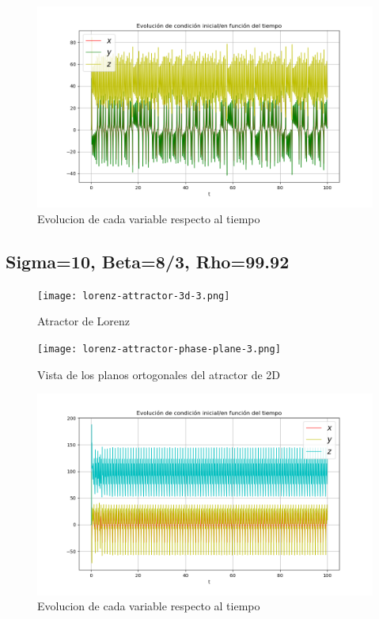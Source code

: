 \documentclass[12pt]{article}
\begin{document}
\begin{figure}
\begin{centering}
  \includegraphics[scale = 0.65]{Evolucion2.png}
  \caption{Evolucion de cada variable respecto al tiempo}
\end{centering}
\end{figure}

\subsection{Sigma=10, Beta=8/3, Rho=99.92}

\begin{figure}
\begin{centering}
  \texttt{[image: lorenz-attractor-3d-3.png]}
  \caption{Atractor de Lorenz}
\end{centering}
\end{figure}

\begin{figure}
\begin{centering}
  \texttt{[image: lorenz-attractor-phase-plane-3.png]}
  \caption{Vista de los planos ortogonales del atractor de 2D}
\end{centering}
\end{figure}

\begin{figure}
\begin{centering}
  \includegraphics[scale = 0.65]{Evolucion3.png}
  \caption{Evolucion de cada variable respecto al tiempo}
\end{centering}
\end{figure}
\end{document}
